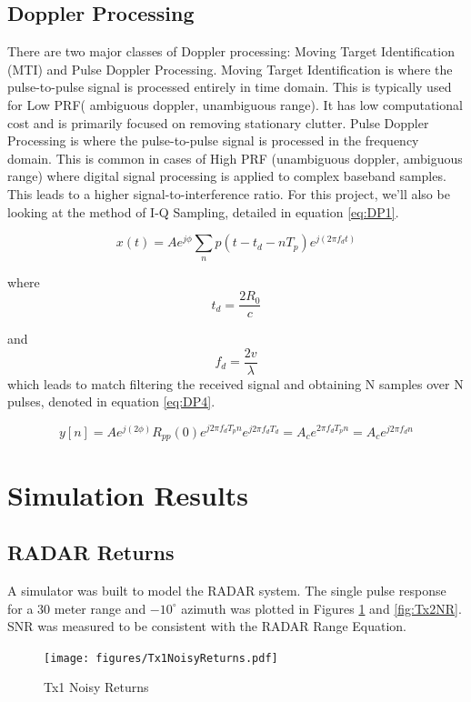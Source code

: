 \documentclass{article}
\begin{document}
\subsection{Doppler Processing}
There are two major classes of Doppler processing: Moving Target Identification (MTI) and Pulse Doppler Processing. Moving Target Identification is where the pulse-to-pulse signal is processed
entirely in time domain. This is typically used for Low PRF( ambiguous doppler, unambiguous range). It has low computational cost and is primarily focused on removing stationary clutter. Pulse Doppler Processing is where the pulse-to-pulse signal is processed in the frequency domain. This is common in cases of High PRF (unambiguous doppler, ambiguous range) where digital signal processing is applied to complex baseband samples. This leads to a higher signal-to-interference ratio. For this project, we'll also be looking at the method of I-Q Sampling, detailed in equation \ref{eq:DP1}.

\begin{equation}
    x(t) = Ae^{j\phi} \sum_{n} p(t - t_d - nT_p)e^{j(2\pi f_d t)}
    \label{eq:DP1}
\end{equation}

where
\begin{equation} 
    t_d = \frac{2R_0}{c} 
    \label{eq:DP2} 
\end{equation}  

and 
\begin{equation} 
    f_d = \frac{2v}{\lambda} 
    \label{eq:DP3} 
\end{equation}
which leads to match filtering the received signal and obtaining N samples over N pulses, denoted in equation \ref{eq:DP4}.

\begin{equation}
    y[n] = Ae^{j(2\phi)} R_{pp} (0) e^{j2\pi f_d T_pn}e^{j2\pi f_d T_d} = A_c e^{2\pi f_d T_pn} = A_c e^{j2\pi f_dn}
    \label{eq:DP4}
\end{equation}

\section{Simulation Results}
\subsection{RADAR Returns}
 A simulator was built to model the RADAR system. The single pulse response for a 30 meter range and $-10^{\circ}$ azimuth was plotted in Figures \ref{fig:Tx1NR} and \ref{fig:Tx2NR}. SNR was measured to be consistent with the RADAR Range Equation.
\begin{figure}[H]
    \centering
    \texttt{[image: figures/Tx1NoisyReturns.pdf]}
    \caption{Tx1 Noisy Returns}
    \label{fig:Tx1NR}
\end{figure}
\end{document}
